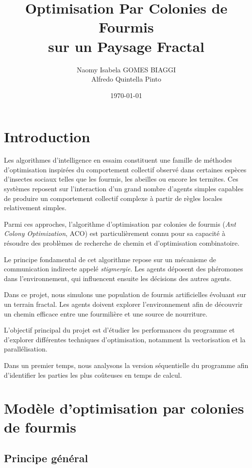 \documentclass[11pt]{article}
\title{Optimisation Par Colonies de Fourmis\\
sur un Paysage Fractal}
\author{Naomy Isabela GOMES BIAGGI \\ Alfredo Quintella Pinto}
\date{\today}
\begin{document}
\maketitle

\section{Introduction}

Les algorithmes d'intelligence en essaim constituent une famille de méthodes d'optimisation inspirées du comportement collectif observé dans certaines espèces d'insectes sociaux telles que les fourmis, les abeilles ou encore les termites. Ces systèmes reposent sur l'interaction d'un grand nombre d'agents simples capables de produire un comportement collectif complexe à partir de règles locales relativement simples.

Parmi ces approches, l'algorithme d'optimisation par colonies de fourmis (\textit{Ant Colony Optimization}, ACO) est particulièrement connu pour sa capacité à résoudre des problèmes de recherche de chemin et d'optimisation combinatoire.

Le principe fondamental de cet algorithme repose sur un mécanisme de communication indirecte appelé \textit{stigmergie}. Les agents déposent des phéromones dans l'environnement, qui influencent ensuite les décisions des autres agents.

Dans ce projet, nous simulons une population de fourmis artificielles évoluant sur un terrain fractal. Les agents doivent explorer l'environnement afin de découvrir un chemin efficace entre une fourmilière et une source de nourriture.

L'objectif principal du projet est d'étudier les performances du programme et d'explorer différentes techniques d'optimisation, notamment la vectorisation et la parallélisation.

Dans un premier temps, nous analysons la version séquentielle du programme afin d'identifier les parties les plus coûteuses en temps de calcul.

\section{Modèle d'optimisation par colonies de fourmis}

\subsection{Principe général}
\end{document}
